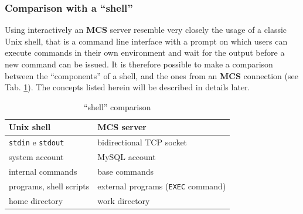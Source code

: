 \documentclass[12pt,titlepage]{article}
\newcommand{\mcs}{\textbf{MCS} }
\begin{document}
%
\subsubsection{Comparison with a ``shell''}
Using interactively an \mcs server resemble very closely the usage of
a classic Unix shell, that is a command line interface with a prompt
on which users can execute commands in their
own environment and wait for the output before a new command can be
issued. It is therefore possible to make a comparison between the
``components'' of a shell, and the ones from an \mcs connection (see
Tab. \ref{paragoneshell}). The concepts listed herein will be
described in details later.

%
\begin{table}[hbtp] \begin{center}
    \bigskip
    \begin{tabular}{|l|l|}
      \hline \textbf{Unix shell} & \textbf{\mcs server} \\ \hline
      \verb|stdin| e \verb|stdout| & bidirectional TCP socket \\
      system account & MySQL account \\ internal commands & base
      commands \\ programs, shell scripts & external programs
      (\verb|EXEC| command) \\ home directory & work directory \\
      \hline
    \end{tabular}
    \caption{``shell'' comparison}\label{paragoneshell}
\end{center} \end{table}
%
\end{document}
